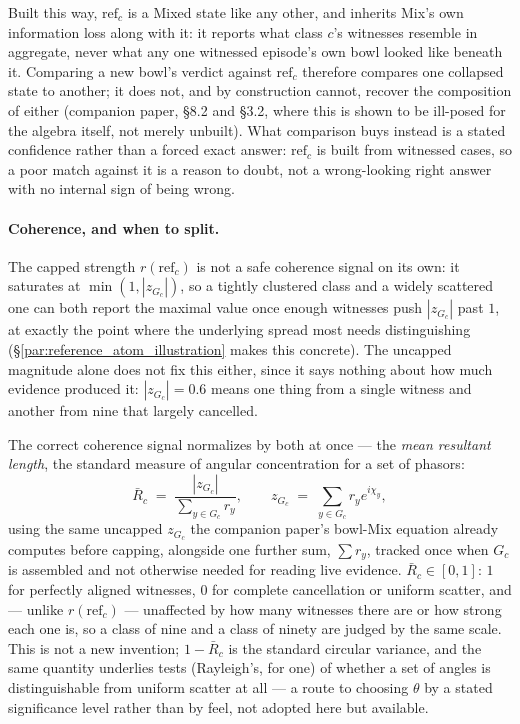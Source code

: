 \documentclass[12pt, a4paper]{article}
\begin{document}
Built this way, $\mathrm{ref}_c$ is a Mixed state like any other, and
inherits Mix's own information loss along with it: it reports what
class $c$'s witnesses resemble in aggregate, never what any one
witnessed episode's own bowl looked like beneath it. Comparing a new
bowl's verdict against $\mathrm{ref}_c$ therefore compares one
collapsed state to another; it does not, and by construction cannot,
recover the composition of either (companion paper, \S8.2 and \S3.2, where
this is shown to be ill-posed for the algebra itself, not merely
unbuilt). What comparison buys instead is a stated confidence rather
than a forced exact answer: $\mathrm{ref}_c$ is built from witnessed
cases, so a poor match against it is a reason to doubt, not a
wrong-looking right answer with no internal sign of being wrong.

\paragraph{Coherence, and when to split.}
The capped strength $r(\mathrm{ref}_c)$ is not a safe coherence
signal on its own: it saturates at $\min(1,|z_{G_c}|)$, so a tightly
clustered class and a widely scattered one can both report the
maximal value once enough witnesses push $|z_{G_c}|$ past $1$, at
exactly the point where the underlying spread most needs
distinguishing (\S\ref{par:reference_atom_illustration} makes this
concrete). The uncapped magnitude alone does not fix this either,
since it says nothing about how much evidence produced it: $|z_{G_c}|
= 0.6$ means one thing from a single witness and another from nine
that largely cancelled.

The correct coherence signal normalizes by both at once --- the
\emph{mean resultant length}, the standard measure of angular
concentration for a set of phasors:
\begin{equation}
    \bar R_c \;=\; \frac{|z_{G_c}|}{\sum_{y\in G_c} r_y},
    \qquad
    z_{G_c} \;=\; \sum_{y\in G_c} r_y e^{i\chi_y},
    \label{eq:coherence}
\end{equation}
using the same uncapped $z_{G_c}$ the companion paper's bowl-Mix
equation already computes before capping, alongside one further sum,
$\sum r_y$, tracked once when $G_c$ is assembled and not otherwise
needed for reading live evidence. $\bar R_c\in[0,1]$: $1$ for
perfectly aligned witnesses, $0$ for complete cancellation or uniform
scatter, and --- unlike $r(\mathrm{ref}_c)$ --- unaffected by how many
witnesses there are or how strong each one is, so a class of nine and
a class of ninety are judged by the same scale. This is not a new
invention; $1-\bar R_c$ is the standard circular variance, and the
same quantity underlies tests (Rayleigh's, for one) of whether a set
of angles is distinguishable from uniform scatter at all --- a route
to choosing $\theta$ by a stated significance level rather than by
feel, not adopted here but available.
\end{document}
